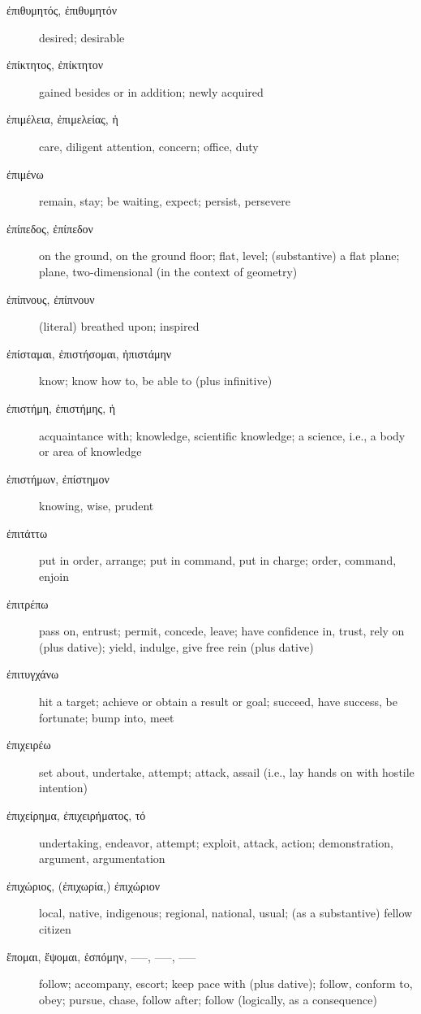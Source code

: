 \documentclass[12pt,letterpaper]{article}
\begin{document}
\begin{description}
    \item[\textgreek{ἐπιθυμητός, ἐπιθυμητόν}] desired; desirable
    \item[\textgreek{ἐπίκτητος, ἐπίκτητον}] gained besides or in addition; newly acquired
    \item[\textgreek{ἐπιμέλεια, ἐπιμελείας, ἡ}] care, diligent attention, concern; office, duty
    \item[\textgreek{ἐπιμένω}] remain, stay; be waiting, expect; persist, persevere
    \item[\textgreek{ἐπίπεδος, ἐπίπεδον}] on the ground, on the ground floor; flat, level; (substantive) a flat plane; plane, two-dimensional (in the context of geometry)
    \item[\textgreek{ἐπίπνους, ἐπίπνουν}] (literal) breathed upon; inspired
    \item[\textgreek{ἐπίσταμαι, ἐπιστήσομαι, ἠπιστάμην}] know; know how to, be able to (plus infinitive)
    \item[\textgreek{ἐπιστήμη, ἐπιστήμης, ἡ}] \marginnote{*}acquaintance with; knowledge, scientific knowledge; a science, i.e., a body or area of knowledge
    \item[\textgreek{ἐπιστήμων, ἐπίστημον}] knowing, wise, prudent
    \item[\textgreek{ἐπιτάττω}] put in order, arrange; put in command, put in charge; order, command, enjoin
    \item[\textgreek{ἐπιτρέπω}] pass on, entrust; permit, concede, leave; have confidence in, trust, rely on (plus dative); yield, indulge, give free rein (plus dative)
    \item[\textgreek{ἐπιτυγχάνω}] hit a target; achieve or obtain a result or goal; succeed, have success, be fortunate; bump into, meet
    \item[\textgreek{ἐπιχειρέω}] set about, undertake, attempt; attack, assail (i.e., lay hands on with hostile intention)
    \item[\textgreek{ἐπιχείρημα, ἐπιχειρήματος, τό}] undertaking, endeavor, attempt; exploit, attack, action; demonstration, argument, argumentation
    \item[\textgreek{ἐπιχώριος, (ἐπιχωρία,) ἐπιχώριον}] local, native, indigenous; regional, national, usual; (as a substantive) fellow citizen
    \item[\textgreek{ἕπομαι, ἕψομαι, ἑσπόμην, –––, –––, –––}] \marginnote{*}follow; accompany, escort; keep pace with (plus dative); follow, conform to, obey; pursue, chase, follow after; follow (logically, as a consequence)

\end{description}
\end{document}

